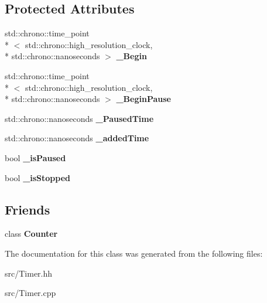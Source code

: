 \subsection*{Protected Attributes}
\begin{DoxyCompactItemize}
\item 
\hypertarget{classstb_1_1Timer_a1613a6eeb760536938046f1a41010a32}{std\+::chrono\+::time\+\_\+point\\*
$<$ std\+::chrono\+::high\+\_\+resolution\+\_\+clock, \\*
std\+::chrono\+::nanoseconds $>$ {\bfseries \+\_\+\+Begin}}\label{classstb_1_1Timer_a1613a6eeb760536938046f1a41010a32}

\item 
\hypertarget{classstb_1_1Timer_ac688e16e37c2b09f1d83a9a2d6df98ea}{std\+::chrono\+::time\+\_\+point\\*
$<$ std\+::chrono\+::high\+\_\+resolution\+\_\+clock, \\*
std\+::chrono\+::nanoseconds $>$ {\bfseries \+\_\+\+Begin\+Pause}}\label{classstb_1_1Timer_ac688e16e37c2b09f1d83a9a2d6df98ea}

\item 
\hypertarget{classstb_1_1Timer_a78f309f8365e4cc4c3aabba2383a3d4d}{std\+::chrono\+::nanoseconds {\bfseries \+\_\+\+Paused\+Time}}\label{classstb_1_1Timer_a78f309f8365e4cc4c3aabba2383a3d4d}

\item 
\hypertarget{classstb_1_1Timer_ad8af48caafad1a0daaef0ca9be597429}{std\+::chrono\+::nanoseconds {\bfseries \+\_\+added\+Time}}\label{classstb_1_1Timer_ad8af48caafad1a0daaef0ca9be597429}

\item 
\hypertarget{classstb_1_1Timer_a0e3889711d526ab1e7962703e0a21606}{bool {\bfseries \+\_\+is\+Paused}}\label{classstb_1_1Timer_a0e3889711d526ab1e7962703e0a21606}

\item 
\hypertarget{classstb_1_1Timer_ab6b5c2077f7444d7cd5041199d69628a}{bool {\bfseries \+\_\+is\+Stopped}}\label{classstb_1_1Timer_ab6b5c2077f7444d7cd5041199d69628a}

\end{DoxyCompactItemize}
\subsection*{Friends}
\begin{DoxyCompactItemize}
\item 
\hypertarget{classstb_1_1Timer_ab25f3b4c3811997d7268d73eb481f239}{class {\bfseries Counter}}\label{classstb_1_1Timer_ab25f3b4c3811997d7268d73eb481f239}

\end{DoxyCompactItemize}


The documentation for this class was generated from the following files\+:\begin{DoxyCompactItemize}
\item 
src/Timer.\+hh\item 
src/Timer.\+cpp\end{DoxyCompactItemize}
